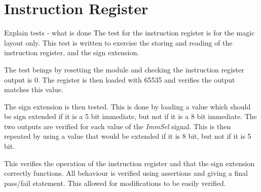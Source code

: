 
\section{Instruction Register}


Explain tests - what is done
The test for the instruction register is for the magic layout only.
This test is written to exercise the storing and reading of the instruction register, and the sign extension.

The test beings by resetting the module and checking the instruction register output is 0. 
The register is then loaded with 65535 and verifies the output matches this value.

The sign extension is then tested. 
This is done by loading a value which should be sign extended if it is a 5 bit immediate, but not if it is a 8 bit immediate. 
The two outputs are verified for each value of the \textit{ImmSel} signal. 
This is then repeated by using a value that would be extended if it is 8 bit, but not if it is 5 bit. 

This verifies the operation of the instruction register and that the sign extension correctly functions. 
All behaviour is verified using assertions and giving a final pass/fail statement. 
This allowed for modifications to be easily verified. 

